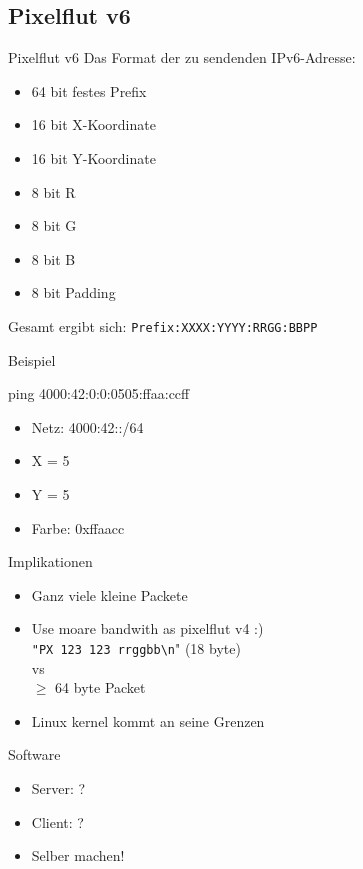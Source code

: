\documentclass[12pt,donthandout,notes=dontshow,xcolor=table]{beamer}
\begin{document}
\subsection{Pixelflut v6}
\begin{frame}[fragile]{Pixelflut v6}
	Das Format der zu sendenden IPv6-Adresse:
	\begin{itemize}
	\item 64 bit festes Prefix
	\item    16 bit X-Koordinate
	\item    16 bit Y-Koordinate
	\item    8 bit R
	\item    8 bit G
	\item    8 bit B
	\item    8 bit Padding
	\end{itemize}
	
	Gesamt ergibt sich: \texttt{Prefix:XXXX:YYYY:RRGG:BBPP}
\end{frame}

\begin{frame}{Beispiel}
	\begin{tcolorbox}[title=Beispiel]
	ping 4000:42:0:0:0505:ffaa:ccff\\
	\begin{itemize}
		\item Netz: 4000:42::/64
		\item X = 5
		\item Y = 5
		\item Farbe: 0xffaacc
	\end{itemize}
	\end{tcolorbox}
\end{frame}

\begin{frame}{Implikationen}
	\begin{itemize}
		\item Ganz viele kleine Packete
		\pause
		\item Use moare bandwith as pixelflut v4 :)\\
		\texttt{"PX 123 123 rrggbb{\textbackslash}n}" (18 byte) \\vs \\$\ge$ 64 byte Packet
		\item Linux kernel kommt an seine Grenzen
	\end{itemize}
\end{frame}

\begin{frame}{Software}
	\begin{itemize}
		\item Server: ?
		\pause
		\item Client: ?
		\pause
		\item Selber machen!
	\end{itemize}
\end{frame}
\end{document}
